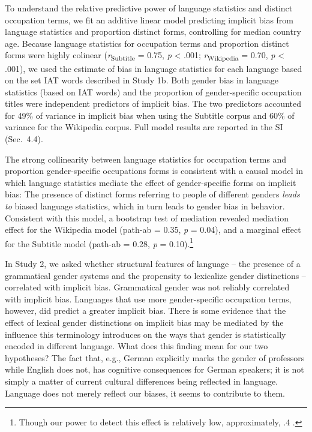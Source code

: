 \documentclass[9pt,twocolumn,twoside]{pnas-new}
\begin{document}
To understand the relative predictive power of language statistics and
distinct occupation terms, we fit an additive linear model predicting implicit bias
from language statistics and proportion distinct forms, controlling for
median country age. Because language statistics for occupation terms and
proportion distinct forms were highly colinear (\emph{r}\textsubscript{Subtitle}  = 0.75, \emph{p}
\textless{} .001; \emph{r}\textsubscript{Wikipedia} =
0.70, \emph{p} \textless{} .001), we used the estimate of bias in language statistics
for each language based on the set IAT words described in Study 1b. Both
gender bias in language statistics (based on IAT words) and the
proportion of gender-specific occupation titles were independent
predictors of implicit bias. The two predictors accounted for 49\% of
variance in implicit bias when using the Subtitle corpus and 60\% of
variance for the Wikipedia corpus. Full model results are reported in
the SI (Sec.\ 4.4).

The strong collinearity between language statistics for
occupation terms and proportion gender-specific occupations forms is
consistent with a causal model in which language statistics mediate the
effect of gender-specific forms on implicit bias: The presence of
distinct forms referring to people of different genders \emph{leads to}
biased language statistics, which in turn leads to gender bias in
behavior. Consistent with this model, a bootstrap test of mediation
revealed mediation effect for the
Wikipedia model (path-ab = 0.35, \emph{p} =
0.04), and a marginal effect for the Subtitle model (path-ab = 0.28,
\emph{p} = 0.10).\footnote{Though our power to detect this effect is relatively low, approximately, .4 \citep[ref.\,][]{schoemann2017determining}.}

In Study 2, we asked whether structural features of language -- the
presence of a grammatical gender systems and the propensity to
lexicalize gender distinctions -- correlated with implicit bias.
Grammatical gender was not reliably correlated with implicit bias.
Languages that use more gender-specific occupation terms, however, did
predict a greater implicit bias. There is some evidence that the effect
of lexical gender distinctions on implicit bias may be mediated by the
influence this terminology introduces on the ways that gender is
statistically encoded in different language. What does this finding mean
for our two hypotheses? The fact that, e.g., German explicitly marks the
gender of professors while English does not, has cognitive consequences
for German speakers; it is not simply a matter of current cultural
differences being reflected in language. Language does not merely
reflect our biases, it seems to contribute to them.
\end{document}

